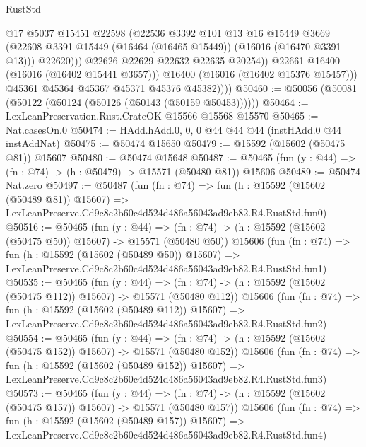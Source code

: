 \begin{lexlean}{RustStd}
\begin{coremodule}
                        @17
                        @5037
                        @15451
                        @22598
                        (@22536
                          @3392
                          @101
                          @13
                          @16
                          @15449
                          @3669
                          (@22608 @3391 @15449 (@16464 (@16465 @15449)) (@16016 (@16470 @3391 @13)))
                          @22620)))
                    @22626
                    @22629
                    @22632
                    @22635
                    @20254))
                @22661
                @16400
                (@16016 (@16402 @15441 @3657)))
              @16400
              (@16016 (@16402 @15376 @15457)))
            @45361
            @45364
            @45367
            @45371
            @45376
            @45382))))
@50460 := @50056 (@50081 (@50122 (@50124 (@50126 (@50143 (@50159 @50453))))))
@50464 := LexLeanPreservation.Rust.CrateOK @15566 @15568 @15570
@50465 := Nat.casesOn.{0}
@50474 := HAdd.hAdd.{0, 0, 0} @44 @44 @44 (instHAdd.{0} @44 instAddNat)
@50475 := @50474 @15650
@50479 := @15592 (@15602 (@50475 @81)) @15607
@50480 := @50474 @15648
@50487 := @50465 (fun (y : @44) => (fn : @74) -> (h : @50479) -> @15571 (@50480 @81)) @15606
@50489 := @50474 Nat.zero
@50497 := @50487
    (fun (fn : @74) =>
    fun (h : @15592 (@15602 (@50489 @81)) @15607) =>
    LexLeanPreserve.Cd9c8c2b60c4d524d486a56043ad9eb82.R4.RustStd.fun0)
@50516 := @50465
    (fun (y : @44) =>
    (fn : @74) -> (h : @15592 (@15602 (@50475 @50)) @15607) -> @15571 (@50480 @50))
    @15606
    (fun (fn : @74) =>
    fun (h : @15592 (@15602 (@50489 @50)) @15607) =>
    LexLeanPreserve.Cd9c8c2b60c4d524d486a56043ad9eb82.R4.RustStd.fun1)
@50535 := @50465
    (fun (y : @44) =>
    (fn : @74) -> (h : @15592 (@15602 (@50475 @112)) @15607) -> @15571 (@50480 @112))
    @15606
    (fun (fn : @74) =>
    fun (h : @15592 (@15602 (@50489 @112)) @15607) =>
    LexLeanPreserve.Cd9c8c2b60c4d524d486a56043ad9eb82.R4.RustStd.fun2)
@50554 := @50465
    (fun (y : @44) =>
    (fn : @74) -> (h : @15592 (@15602 (@50475 @152)) @15607) -> @15571 (@50480 @152))
    @15606
    (fun (fn : @74) =>
    fun (h : @15592 (@15602 (@50489 @152)) @15607) =>
    LexLeanPreserve.Cd9c8c2b60c4d524d486a56043ad9eb82.R4.RustStd.fun3)
@50573 := @50465
    (fun (y : @44) =>
    (fn : @74) -> (h : @15592 (@15602 (@50475 @157)) @15607) -> @15571 (@50480 @157))
    @15606
    (fun (fn : @74) =>
    fun (h : @15592 (@15602 (@50489 @157)) @15607) =>
    LexLeanPreserve.Cd9c8c2b60c4d524d486a56043ad9eb82.R4.RustStd.fun4)

\end{coremodule}
\end{lexlean}
